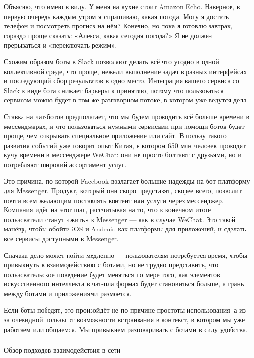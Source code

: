 Объясню, что имею в виду. У меня на кухне стоит Amazon Echo. Наверное, в первую очередь каждым утром я спрашиваю, какая погода. Могу я достать телефон и посмотреть прогноз на нём? Конечно, но пока я готовлю завтрак, гораздо проще сказать: «Алекса, какая сегодня погода?» Я не должен прерываться и «переключать режим».

Схожим образом боты в Slack позволяют делать всё что угодно в одной коллективной среде, что проще, нежели выполнение задач в разных интерфейсах и последующий сбор результатов в одно место. Интеграция вашего сервиса со Slack в виде бота снижает барьеры к принятию, потому что пользоваться сервисом можно будет в том же разговорном потоке, в котором уже ведутся дела.

Ставка на чат-ботов предполагает, что мы будем проводить всё больше времени в мессенджерах, и что пользоваться нужными сервисами при помощи ботов будет проще, чем открывать специальное приложение или сайт. В пользу такого развития событий уже говорит опыт Китая, в котором 650 млн человек проводят кучу времени в мессенджере WeChat: они не просто болтают с друзьями, но и потребляют широкий ассортимент услуг.

Это причина, по которой Facebook возлагает большие надежды на бот-платформу для Messenger. Продукт, который они скоро представят, скорее всего, позволит почти всем желающим поставлять контент или услуги через мессенджер. Компания идёт на этот шаг, рассчитывая на то, что в конечном итоге пользователи станут «жить» в Messenger — как в случае WeChat. Это такой манёвр, чтобы обойти iOS и Android как платформы для приложений, и сделать все сервисы доступными в Messenger.

Сначала дело может пойти медленно — пользователям потребуется время, чтобы привыкнуть к взаимодействию с ботами, но не трудно представить, что пользовательское поведение будет меняться по мере того, как элементов искусственного интеллекта в чат-платформах будет становиться больше, а грань между ботами и приложениями размоется.

Если боты победят, это произойдёт не по причине простоты использования, а из-за очевидной пользы от возможности встраивания в контекст, в котором мы уже работаем или общаемся. Мы привыкнем разговаривать с ботами в силу удобства.

\subsubsection{} Обзор подходов взаимодействия в сети
\label{sec:analysis:literature:restsoap}

